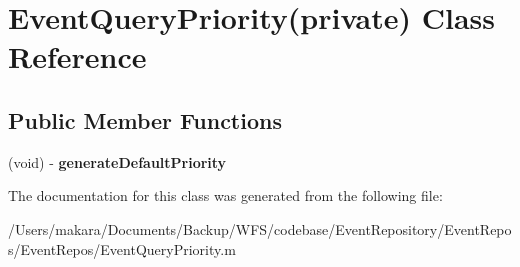 \hypertarget{interface_event_query_priority_07private_08}{
\section{\-Event\-Query\-Priority(private) \-Class \-Reference}
\label{interface_event_query_priority_07private_08}
}
\subsection*{\-Public \-Member \-Functions}
\begin{DoxyCompactItemize}
\item 
\hypertarget{interface_event_query_priority_07private_08_a054f573fec14a26d44e40bd7d339e7b2}{
(void) -\/ {\bfseries generate\-Default\-Priority}}
\label{interface_event_query_priority_07private_08_a054f573fec14a26d44e40bd7d339e7b2}

\end{DoxyCompactItemize}


\-The documentation for this class was generated from the following file\-:\begin{DoxyCompactItemize}
\item 
/\-Users/makara/\-Documents/\-Backup/\-W\-F\-S/codebase/\-Event\-Repository/\-Event\-Repos/\-Event\-Repos/\-Event\-Query\-Priority.\-m\end{DoxyCompactItemize}
